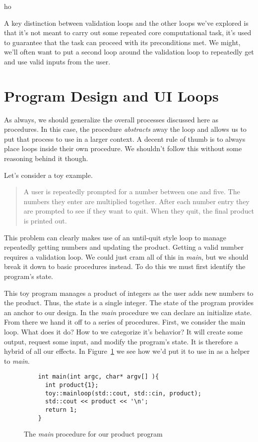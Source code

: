 ho\documentclass[]{tufte-handout}
\begin{document}
A key distinction between validation loops and the other loops we've explored is that it's not meant to carry out some repeated core computational task, it's used to guarantee that the task can proceed with its preconditions met. We might, we'll often want to put a second loop around the validation loop to repeatedly get and use valid inputs from the user.

\section{Program Design and UI Loops}

As always, we should generalize the overall processes discussed here as procedures. In this case, the procedure \textit{abstracts} away the loop and allows us to put that process to use in a larger context. A decent rule of thumb is to always place loops inside their own procedure. We shouldn't follow this without some reasoning behind it though.

Let's consider a toy example.
\begin{quote}
  A user is repeatedly prompted for a number between one and five. The numbers they enter are multiplied together. After each number entry they are prompted to see if they want to quit. When they quit, the final product is printed out.
\end{quote}

This problem can clearly makes use of an until-quit style loop to manage repeatedly getting numbers and updating the product. Getting a valid number requires a validation loop. We could just cram all of this in \textit{main}, but we should break it down to basic procedures instead. To do this we must first identify the program's state.

This toy program manages a product of integers as the user adds new numbers to the product. Thus, the state is a single integer. The state of the program provides an anchor to our design.  In the \textit{main} procedure we can declare an initialize state. From there we hand it off to a series of procedures. First, we consider the main loop. What does it do? How to we categorize it's behavior? It will create some output, request some input, and modify the program's state. It is therefore a hybrid of all our effects. In Figure~\ref{ex:main} we see how we'd put it to use in as a helper to \textit{main}.

\begin{figure}
  \begin{lstlisting}
    int main(int argc, char* argv[] ){
      int product{1};
      toy::mainloop(std::cout, std::cin, product);
      std::cout << product << '\n';
      return 1;
    }
  \end{lstlisting}
\caption{The \textit{main} procedure for our product program}
\label{ex:main}
\end{figure}
\end{document}
